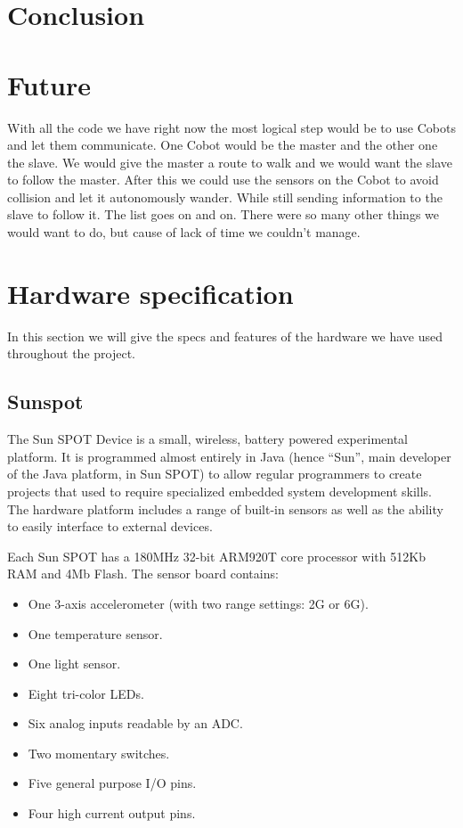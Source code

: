 \documentclass[a4paper,10pt]{article} %
\begin{document}

\section{Conclusion} %


\section{Future} %
\label{sec:future}

With all the code we have right now the most logical step would be to use Cobots
and let them communicate. One Cobot would be the master and the other one the
slave. We would give the master a route to walk and we would want the slave to
follow the master. After this we could use the sensors on the Cobot to avoid
collision and let it autonomously wander. While still sending information to the
slave to follow it. The list goes on and on. There were so many other things we
would want to do, but cause of lack of time we couldn't manage.


\appendix

\section{Hardware specification} %
\label{app:hardware}

In this section we will give the specs and features of the hardware we have used
throughout the project.

\subsection{Sunspot} %
\label{app:sunspot}

The Sun SPOT Device is a small, wireless, battery powered experimental platform.
It is programmed almost entirely in Java (hence ``Sun'', main developer of the
Java platform, in Sun SPOT) to allow regular programmers to create projects that
used to require specialized embedded system development skills. The hardware
platform includes a range of built-in sensors as well as the ability to easily
interface to external devices.

Each Sun SPOT has a 180MHz 32-bit ARM920T core processor with 512Kb RAM and 4Mb
Flash. The sensor board contains:

\begin{itemize}
    \item One 3-axis accelerometer (with two range settings: 2G or 6G).
    \item One temperature sensor.
    \item One light sensor.
    \item Eight tri-color LEDs.
    \item Six analog inputs readable by an ADC.
    \item Two momentary switches.
    \item Five general purpose I/O pins.
    \item Four high current output pins.
\end{itemize}
\end{document}
